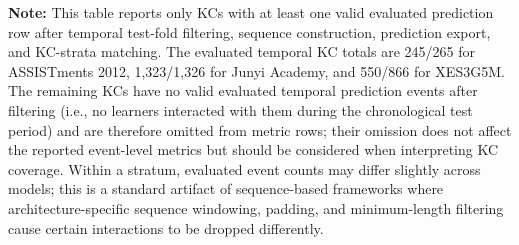\begin{table}[htbp]
{\begin{tabular}{lllcrccccc}
\end{tabular}%
}

\vspace{1ex}
{\scriptsize \textbf{Note:} This table reports only KCs with at least one valid evaluated prediction row after temporal test-fold filtering, sequence construction, prediction export, and KC-strata matching. The evaluated temporal KC totals are 245/265 for ASSISTments 2012, 1,323/1,326 for Junyi Academy, and 550/866 for XES3G5M. The remaining KCs have no valid evaluated temporal prediction events after filtering (i.e., no learners interacted with them during the chronological test period) and are therefore omitted from metric rows; their omission does not affect the reported event-level metrics but should be considered when interpreting KC coverage. Within a stratum, evaluated event counts may differ slightly across models; this is a standard artifact of sequence-based frameworks where architecture-specific sequence windowing, padding, and minimum-length filtering cause certain interactions to be dropped differently.\par}

\end{table}
